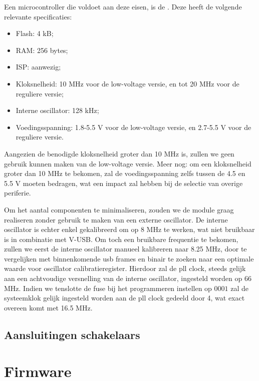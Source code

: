 Een microcontroller die voldoet aan deze eisen, is de . Deze heeft de volgende relevante specificaties:
\begin{itemize}
\item Flash: 4 kB;
\item RAM: 256 bytes;
\item ISP: aanwezig;
\item Kloksnelheid: 10 MHz voor de low-voltage versie, en tot 20 MHz voor de reguliere versie;
\item Interne oscillator: 128 kHz;
\item Voedingsspanning: 1.8-5.5 V voor de low-voltage versie, en 2.7-5.5 V voor de reguliere versie.
\end{itemize}

Aangezien de benodigde kloksnelheid groter dan 10 MHz is, zullen we geen gebruik kunnen maken van de low-voltage versie. Meer nog: om een kloksnelheid groter dan 10 MHz te bekomen, zal de voedingsspanning zelfs tussen de 4.5 en 5.5 V moeten bedragen, wat een impact zal hebben bij de selectie van overige periferie.

Om het aantal componenten te minimaliseren, zouden we de module graag realiseren zonder gebruik te maken van een externe oscillator. De interne oscillator is echter enkel gekalibreerd om op 8 MHz te werken, wat niet bruikbaar is in combinatie met V-USB. Om toch een bruikbare frequentie te bekomen, zullen we eerst de interne oscillator manueel kalibreren naar 8.25 MHz, door te vergelijken met binnenkomende \ac{usb} frames en binair te zoeken naar een optimale waarde voor  oscillator calibratieregister. Hierdoor zal de \ac{pll} clock, steeds gelijk aan een achtvoudige versnelling van de interne oscillator, ingesteld worden op 66 MHz. Indien we tenslotte de  fuse bij het programmeren instellen op $0001$ zal de systeemklok gelijk ingesteld worden aan de \ac{pll} clock gedeeld door 4, wat exact overeen komt met 16.5 MHz.

\section{Aansluitingen schakelaars}

\chapter{Firmware}
